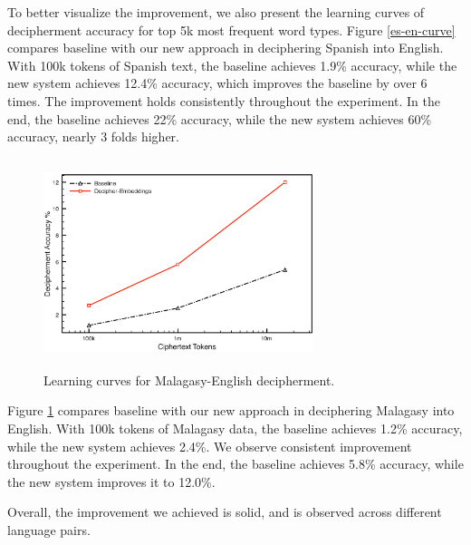 To better visualize the improvement, we also present the learning curves of decipherment accuracy for top 5k most frequent word types. Figure \ref{es-en-curve} compares baseline with our new approach in deciphering Spanish into English. With 100k tokens of Spanish text, the baseline achieves 1.9\% accuracy, while the new system achieves 12.4\% accuracy, which improves the baseline by over 6 times. The improvement holds consistently throughout the experiment. In the end, the baseline achieves 22\% accuracy, while the new system achieves 60\% accuracy, nearly 3 folds higher. 

 \begin{figure}[!ht]
  \centering
  \includegraphics[width=3.1in,height=2.4in]{mlg_en_curve}
  \caption{Learning curves for Malagasy-English decipherment.}
\label{mlg-en-curve}
\end{figure}


Figure \ref{mlg-en-curve} compares baseline with our new approach in deciphering Malagasy into English. With 100k tokens of Malagasy data, the baseline achieves 1.2\% accuracy, while the new system achieves 2.4\%.  We observe consistent improvement throughout the experiment. In the end, the baseline achieves 5.8\% accuracy, while the new system improves it to 12.0\%.

Overall, the improvement we achieved is solid, and is observed across different language pairs. 

 





